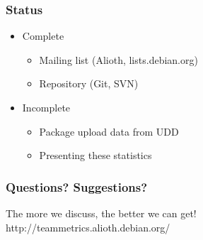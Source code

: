 \documentclass[compress]{beamer}
\begin{document}
\begin{frame}
    \frametitle{Status}
    \begin{itemize}
        \item Complete
        \begin{itemize}
            \item Mailing list (Alioth, lists.debian.org)
            \item Repository (Git, SVN)
        \end{itemize}
    \end{itemize}

    \begin{itemize}
        \item Incomplete
        \begin{itemize}
            \item Package upload data from UDD
            \item Presenting these statistics
        \end{itemize}
    \end{itemize}
\end{frame}

\begin{frame}
    \frametitle{Questions? Suggestions?}
    \begin{center}
    The more we discuss, the better we can get! \vspace{1in} http://teammetrics.alioth.debian.org/
    \end{center}
\end{frame}
\end{document}
